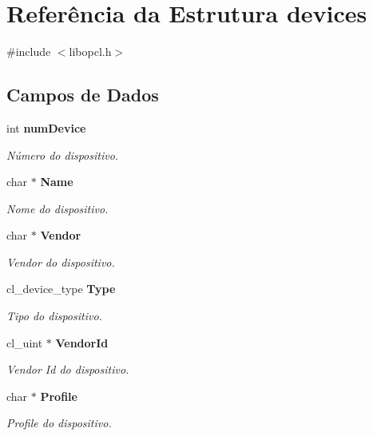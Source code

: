 \section{Referência da Estrutura devices}
\label{structdevices}


{\ttfamily \#include $<$libopcl.\+h$>$}

\subsection*{Campos de Dados}
\begin{DoxyCompactItemize}
\item 
\mbox{\label{structdevices_a6856fb3bba012c7b3abcfbe847ea4d27}} 
int \textbf{ num\+Device}
\begin{DoxyCompactList}\small\item\em Número do dispositivo. \end{DoxyCompactList}\item 
\mbox{\label{structdevices_a5e6182c030324511dd82e9fa1a0ab071}} 
char $\ast$ \textbf{ Name}
\begin{DoxyCompactList}\small\item\em Nome do dispositivo. \end{DoxyCompactList}\item 
\mbox{\label{structdevices_a3edc9ba9f59b30aa97a8d6d258caa80f}} 
char $\ast$ \textbf{ Vendor}
\begin{DoxyCompactList}\small\item\em Vendor do dispositivo. \end{DoxyCompactList}\item 
\mbox{\label{structdevices_af66389a0175743dbb20408cc354de4f1}} 
cl\+\_\+device\+\_\+type \textbf{ Type}
\begin{DoxyCompactList}\small\item\em Tipo do dispositivo. \end{DoxyCompactList}\item 
\mbox{\label{structdevices_a1daa59b7c3a24931a3d38b8f2e30d2cd}} 
cl\+\_\+uint $\ast$ \textbf{ Vendor\+Id}
\begin{DoxyCompactList}\small\item\em Vendor Id do dispositivo. \end{DoxyCompactList}\item 
\mbox{\label{structdevices_aa03bc49fe9aa53252d807b5b29c2fa5b}} 
char $\ast$ \textbf{ Profile}
\begin{DoxyCompactList}\small\item\em Profile do dispositivo. \end{DoxyCompactList}\item 

\end{DoxyCompactItemize}
